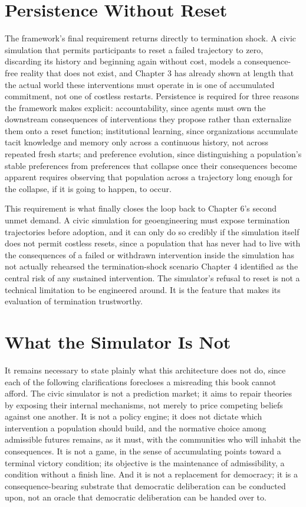 \documentclass[11pt,oneside]{book}
\begin{document}
\section*{Persistence Without Reset}

The framework's final requirement returns directly to termination shock. A civic simulation that permits participants to reset a failed trajectory to zero, discarding its history and beginning again without cost, models a consequence-free reality that does not exist, and Chapter 3 has already shown at length that the actual world these interventions must operate in is one of accumulated commitment, not one of costless restarts. Persistence is required for three reasons the framework makes explicit: accountability, since agents must own the downstream consequences of interventions they propose rather than externalize them onto a reset function; institutional learning, since organizations accumulate tacit knowledge and memory only across a continuous history, not across repeated fresh starts; and preference evolution, since distinguishing a population's stable preferences from preferences that collapse once their consequences become apparent requires observing that population across a trajectory long enough for the collapse, if it is going to happen, to occur.

This requirement is what finally closes the loop back to Chapter 6's second unmet demand. A civic simulation for geoengineering must expose termination trajectories before adoption, and it can only do so credibly if the simulation itself does not permit costless resets, since a population that has never had to live with the consequences of a failed or withdrawn intervention inside the simulation has not actually rehearsed the termination-shock scenario Chapter 4 identified as the central risk of any sustained intervention. The simulator's refusal to reset is not a technical limitation to be engineered around. It is the feature that makes its evaluation of termination trustworthy.

\section*{What the Simulator Is Not}

It remains necessary to state plainly what this architecture does not do, since each of the following clarifications forecloses a misreading this book cannot afford. The civic simulator is not a prediction market; it aims to repair theories by exposing their internal mechanisms, not merely to price competing beliefs against one another. It is not a policy engine; it does not dictate which intervention a population should build, and the normative choice among admissible futures remains, as it must, with the communities who will inhabit the consequences. It is not a game, in the sense of accumulating points toward a terminal victory condition; its objective is the maintenance of admissibility, a condition without a finish line. And it is not a replacement for democracy; it is a consequence-bearing substrate that democratic deliberation can be conducted upon, not an oracle that democratic deliberation can be handed over to.
\end{document}
